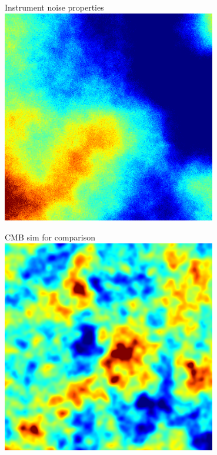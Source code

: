 \documentclass[table]{beamer}
\begin{document}
\begin{frame}{Instrument noise properties}
	\centering
	\includegraphics[width=0.7\textwidth]{maps/noise_sim.png}
\end{frame}
\begin{frame}{CMB sim for comparison}
	\centering
	\includegraphics[width=0.7\textwidth]{maps/cmb_sim.png}
\end{frame}
\end{document}
